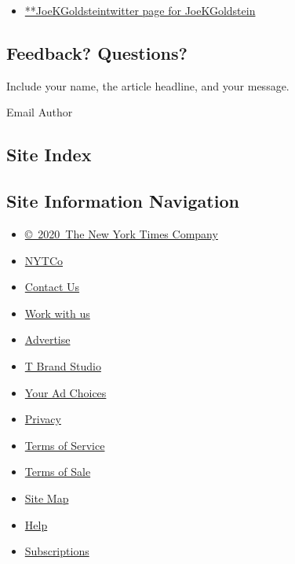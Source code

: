 \begin{itemize}
\tightlist
\item
  \href{https://twitter.com/JoeKGoldstein}{**JoeKGoldsteintwitter page
  for JoeKGoldstein}
\end{itemize}

\hypertarget{feedback-questions}{%
\subsection{Feedback? Questions?}\label{feedback-questions}}

Include your name, the article headline, and your message.

Email Author

\hypertarget{site-index}{%
\subsection{Site Index}\label{site-index}}

\hypertarget{site-information-navigation}{%
\subsection{Site Information
Navigation}\label{site-information-navigation}}

\begin{itemize}
\tightlist
\item
  \href{https://help.nytimes.com/hc/en-us/articles/115014792127-Copyright-notice}{©~2020~The
  New York Times Company}
\end{itemize}

\begin{itemize}
\tightlist
\item
  \href{https://www.nytco.com/}{NYTCo}
\item
  \href{https://help.nytimes.com/hc/en-us/articles/115015385887-Contact-Us}{Contact
  Us}
\item
  \href{https://www.nytco.com/careers/}{Work with us}
\item
  \href{https://nytmediakit.com/}{Advertise}
\item
  \href{http://www.tbrandstudio.com/}{T Brand Studio}
\item
  \href{https://www.nytimes.com/privacy/cookie-policy\#how-do-i-manage-trackers}{Your
  Ad Choices}
\item
  \href{https://www.nytimes.com/privacy}{Privacy}
\item
  \href{https://help.nytimes.com/hc/en-us/articles/115014893428-Terms-of-service}{Terms
  of Service}
\item
  \href{https://help.nytimes.com/hc/en-us/articles/115014893968-Terms-of-sale}{Terms
  of Sale}
\item
  \href{https://spiderbites.nytimes.com}{Site Map}
\item
  \href{https://help.nytimes.com/hc/en-us}{Help}
\item
  \href{https://www.nytimes.com/subscription?campaignId=37WXW}{Subscriptions}
\end{itemize}
